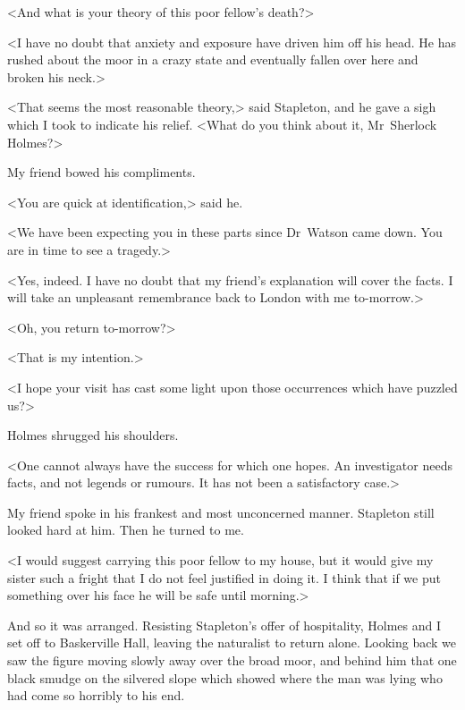 <And what is your theory of this poor fellow's death?>

<I have no doubt that anxiety and exposure have driven him off his head. He has rushed about the moor in a crazy state and eventually fallen over here and broken his neck.>

<That seems the most reasonable theory,> said Stapleton, and he gave a sigh which I took to indicate his relief. <What do you think about it, Mr~Sherlock Holmes?>

My friend bowed his compliments.

<You are quick at identification,> said he.

<We have been expecting you in these parts since Dr~Watson came down. You are in time to see a tragedy.>

<Yes, indeed. I have no doubt that my friend's explanation will cover the facts. I will take an unpleasant remembrance back to London with me to-morrow.>

<Oh, you return to-morrow?>

<That is my intention.>

<I hope your visit has cast some light upon those occurrences which have puzzled us?>

Holmes shrugged his shoulders.

<One cannot always have the success for which one hopes. An investigator needs facts, and not legends or rumours. It has not been a satisfactory case.>

My friend spoke in his frankest and most unconcerned manner. Stapleton still looked hard at him. Then he turned to me.

<I would suggest carrying this poor fellow to my house, but it would give my sister such a fright that I do not feel justified in doing it. I think that if we put something over his face he will be safe until morning.>

And so it was arranged. Resisting Stapleton's offer of hospitality, Holmes and I set off to Baskerville Hall, leaving the naturalist to return alone. Looking back we saw the figure moving slowly away over the broad moor, and behind him that one black smudge on the silvered slope which showed where the man was lying who had come so horribly to his end.